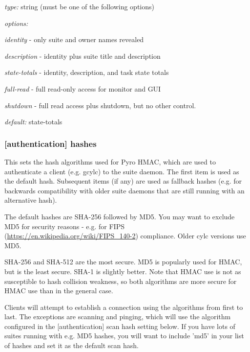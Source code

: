 \begin{myitemize}
\item {\em type:} string (must be one of the following options)
\item {\em options:}
    \begin{myitemize}
        \item {\em identity} - only suite and owner names revealed
        \item {\em description} - identity plus suite title and description
        \item {\em state-totals} - identity, description, and task state totals
        \item {\em full-read} - full read-only access for monitor and GUI
        \item {\em shutdown} - full read access plus shutdown, but no other
            control.
    \end{myitemize}
\item {\em default:} state-totals
\end{myitemize}

\subsubsection{[authentication] \textrightarrow hashes}

This sets the hash algorithms used for Pyro HMAC, which are used to
authenticate a client (e.g. gcylc) to the suite daemon. The first item is used
as the default hash. Subsequent items (if any) are used as fallback hashes
(e.g. for backwards compatibility with older suite daemons that are still
running with an alternative hash).

The default hashes are SHA-256 followed by MD5. You may want to exclude MD5 for
security reasons - e.g. for FIPS
(\url{https://en.wikipedia.org/wiki/FIPS_140-2}) compliance. Older cylc
versions use MD5.

SHA-256 and SHA-512 are the most secure. MD5 is popularly used for HMAC, but is
the least secure. SHA-1 is slightly better. Note that HMAC use is not as
susceptible to hash collision weakness, so both algorithms are more secure for
HMAC use than in the general case.

Clients will attempt to establish a connection using the algorithms from first
to last. The exceptions are scanning and pinging, which will use the algorithm
configured in the [authentication] \textrightarrow scan hash setting below. If
you have lots of suites running with e.g. MD5 hashes, you will want to include
'md5' in your list of hashes and set it as the default scan hash.

